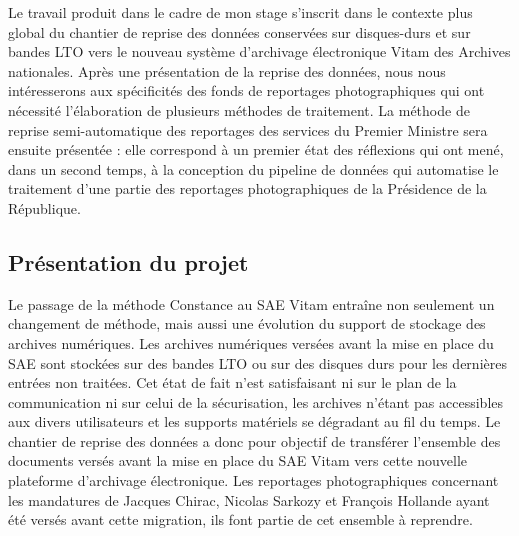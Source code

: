 Le travail produit dans le cadre de mon stage s'inscrit dans le contexte plus global du chantier de reprise des données conservées sur disques-durs et sur bandes LTO vers le nouveau système d'archivage électronique Vitam des Archives nationales. Après une présentation de la reprise des données, nous nous intéresserons aux spécificités des fonds de reportages photographiques qui ont nécessité l'élaboration de plusieurs méthodes de traitement. La méthode de reprise semi-automatique des reportages des services du Premier Ministre sera ensuite présentée : elle correspond à un premier état des réflexions qui ont mené, dans un second temps, à la conception du pipeline de données qui automatise le traitement d'une partie des reportages photographiques de la Présidence de la République.

\subsection*{Présentation du projet}

Le passage de la méthode Constance au SAE Vitam entraîne non seulement un changement de méthode, mais aussi une évolution du support de stockage des archives numériques. Les archives numériques versées avant la mise en place du SAE sont stockées sur des bandes LTO ou sur des disques durs pour les dernières entrées non traitées. Cet état de fait n'est satisfaisant ni sur le plan de la communication ni sur celui de la sécurisation, les archives n'étant pas accessibles aux divers utilisateurs et les supports matériels se dégradant au fil du temps. Le chantier de reprise des données a donc pour objectif de transférer l'ensemble des documents versés avant la mise en place du SAE Vitam vers cette nouvelle plateforme d'archivage électronique. Les reportages photographiques concernant les mandatures de Jacques Chirac, Nicolas Sarkozy et François Hollande ayant été versés avant cette migration, ils font partie de cet ensemble à reprendre.

